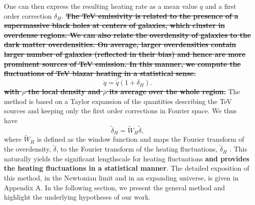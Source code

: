 \documentclass[twocolumns]{emulateapj}
\newcommand\ALc[1]{{\color{red} \bf #1}} %
\begin{document}
One can then express the resulting heating rate as a mean value $\dot{q}$ and a first order correction $\delta_H$. \ALc{\sout{The TeV emissivity is related to the presence of a supermassive black holes at centers of galaxies, which cluster in overdense regions. We can also relate the overdensity of galaxies to the dark matter overdensities.  On average, larger overdensities contain larger number of galaxies (reflected in their bias) and hence are more prominent sources of TeV emission. In this manner, we compute the fluctuations of TeV blazar heating in a statistical sense.}}
\begin{equation}
  \label{eq:delta_h}
  \dot{q}=\bar{\dot{q}}(1+\delta_H).
\end{equation}
\ALc{\sout{with $\rho$ the local density and $\bar{\rho}$ its average over the whole region.}} The method is based on a Taylor expansion of the quantities describing the TeV sources and keeping only the first order corrections in Fourier space.  We thus have
\begin{equation}
  \label{eq:use_window}
  \tilde{\delta}_H=\tilde{W}_H\tilde{\delta},
\end{equation}
where $\tilde{W}_H$ is defined as the window function and maps the Fourier transform of the overdensity, $\tilde{\delta}$, to the Fourier transform of the heating fluctuations, $\tilde{\delta}_H$ . This naturally yields the significant lengthscale for heating fluctuations \ALc{ and provides the heating fluctuations in a statistical manner}.
The detailed exposition of this method, in the Newtonian limit and in an expanding universe, is given in Appendix A. In the following section, we present the general method and highlight the underlying hypotheses of our work.
\end{document}
